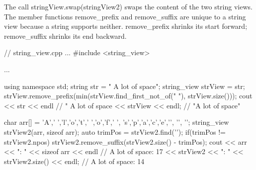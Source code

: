 The call stringView.swap(stringView2) swaps the content of the two string views. The member functions remove\_prefix and remove\_suffix are unique to a string view because a string supports neither. remove\_prefix shrinks its start forward; remove\_suffix shrinks its end backward.


\begin{cpp}
// string_view.cpp
...
#include <string_view>

...

using namespace std;
string str = " A lot of space";
string_view strView = str;
strView.remove_prefix(min(strView.find_first_not_of(" "), strView.size()));
cout << str << endl // " A lot of space
	 << strView << endl; // "A lot of space"
	 
char arr[] = {'A',' ','l','o','t',' ','o','f',' ',
			  's','p','a','c','e','\0', '\0', '\0'};
string_view strView2(arr, sizeof arr);
auto trimPos = strView2.find('\0');
if(trimPos != strView2.npos) strView2.remove_suffix(strView2.size() - trimPos);
cout << arr << ": " << sizeof arr << endl // A lot of space: 17
	 << strView2 << ": " << strView2.size() << endl; // A lot of space: 14
\end{cpp}

